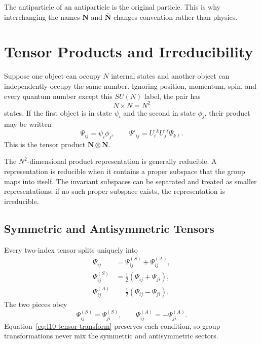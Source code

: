 The antiparticle of an antiparticle is the original particle. This is why interchanging the names \(\mathbf N\) and \(\overline{\mathbf N}\) changes convention rather than physics.

\section{Tensor Products and Irreducibility}

Suppose one object can occupy \(N\) internal states and another object can independently occupy the same number. Ignoring position, momentum, spin, and every quantum number except this \(SU(N)\) label, the pair has
\begin{equation}
N\times N=N^2
\label{eq:l10-product-count}
\end{equation}
states. If the first object is in state \(\psi_i\) and the second in state \(\phi_j\), their product may be written
\begin{equation}
\Psi_{ij}=\psi_i\phi_j,
\qquad
\Psi'_{ij}=U_i{}^kU_j{}^\ell\Psi_{k\ell}.
\label{eq:l10-tensor-transform}
\end{equation}
This is the tensor product \(\mathbf N\otimes\mathbf N\).

\begin{classroomqa}
\end{classroomqa}

The \(N^2\)-dimensional product representation is generally reducible. A representation is reducible when it contains a proper subspace that the group maps into itself. The invariant subspaces can be separated and treated as smaller representations; if no such proper subspace exists, the representation is irreducible.

\subsection{Symmetric and Antisymmetric Tensors}

Every two-index tensor splits uniquely into
\begin{align}
\Psi_{ij}
&=\Psi^{(S)}_{ij}+\Psi^{(A)}_{ij},\\
\Psi^{(S)}_{ij}
&=\frac12(\Psi_{ij}+\Psi_{ji}),\\
\Psi^{(A)}_{ij}
&=\frac12(\Psi_{ij}-\Psi_{ji}).
\label{eq:l10-sym-anti}
\end{align}
The two pieces obey
\begin{equation}
\Psi^{(S)}_{ij}=\Psi^{(S)}_{ji},
\qquad
\Psi^{(A)}_{ij}=-\Psi^{(A)}_{ji}.
\end{equation}
Equation~\eqref{eq:l10-tensor-transform} preserves each condition, so group transformations never mix the symmetric and antisymmetric sectors.

